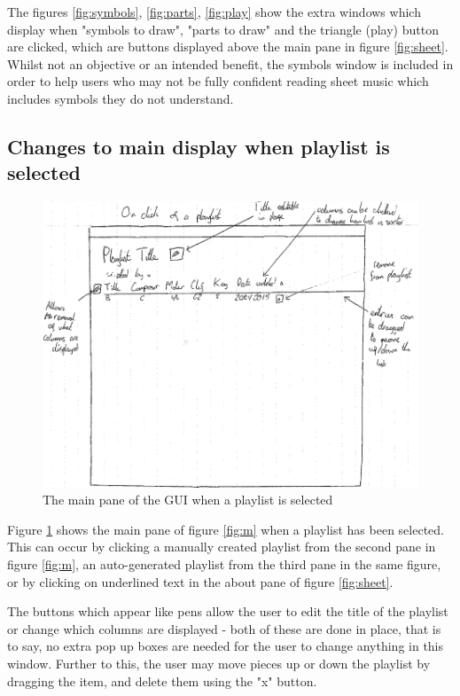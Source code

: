 \begin{appendices}
\begin{figure}[H]
\begin{minipage}{160pt}
\end{minipage}
\end{figure}
The figures \ref{fig:symbols}, \ref{fig:parts}, \ref{fig:play} show the extra windows which display when "symbols to draw", "parts to draw" and the triangle (play) button are clicked, which are buttons displayed above the main pane in figure \ref{fig:sheet}. Whilst not an objective or an intended benefit, the symbols window is included in order to help users who may not be fully confident reading sheet music which includes symbols they do not understand.

\subsection{Changes to main display when playlist is selected}
\begin{figure}[H]
	\includegraphics[width=500pt]{designs/playlist}
	\caption{The main pane of the GUI when a playlist is selected}
	\label{fig:playlist}
\end{figure}
Figure \ref{fig:playlist} shows the main pane of figure \ref{fig:m} when a playlist has been selected. This can occur by clicking a manually created playlist from the second pane in figure \ref{fig:m}, an auto-generated playlist from the third pane in the same figure, or by clicking on underlined text in the about pane of figure \ref{fig:sheet}.

The buttons which appear like pens allow the user to edit the title of the playlist or change which columns are displayed - both of these are done in place, that is to say, no extra pop up boxes are needed for the user to change anything in this window. Further to this, the user may move pieces up or down the playlist by dragging the item, and delete them using the "x" button.


\end{appendices}

